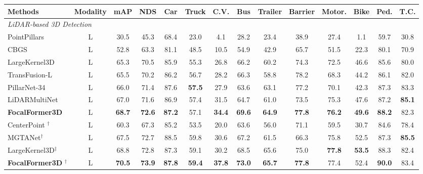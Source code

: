 \documentclass[10pt,twocolumn,letterpaper]{article}
\begin{document}
\begin{table*}[bpt]
	\begin{center}
		\begin{adjustbox}{width=1.\textwidth}
		\begin{tabular}{lccccccccccccc}
			\toprule
			Methods & Modality & mAP & NDS & Car & Truck & C.V. & Bus & Trailer & Barrier & Motor. & Bike & Ped. & T.C. \\ \midrule \midrule
                \multicolumn{5}{l}{\textit{LiDAR-based 3D Detection}} \\
                \midrule
			PointPillars \cite{pointpillar} & L & 30.5 & 45.3 & 68.4 & 23.0 & 4.1 & 28.2 & 23.4 & 38.9 & 27.4 & 1.1 & 59.7 & 30.8 \\
			CBGS \cite{cbgs} & L & 52.8 & 63.3 & 81.1 & 48.5 & 10.5 & 54.9 & 42.9 & 65.7 & 51.5 & 22.3 & 80.1 & 70.9 \\
			LargeKernel3D \cite{largekernel3d} & L & 65.3 & 70.5 & 85.9 & 55.3 & 26.8 & 66.2 & 60.2 & 74.3 & 72.5 & 46.6 & 85.6 & 80.0 \\
			TransFusion-L \cite{transfusion} & L & 65.5 & 70.2 & 86.2 & 56.7 & 28.2 & 66.3 & 58.8 & 78.2 & 68.3 & 44.2 & 86.1 & 82.0 \\
                PillarNet-34~\cite{shi2022pillarnet} & L & 66.0 & 71.4 & 87.6 &\textbf{57.5} & 27.9 & 63.6 & 63.1 & 77.2 & 70.1 & 42.3 & 87.3 & 83.3 \\
            LiDARMultiNet~\ \cite{ye2022lidarmultinet} & L & 67.0 & 71.6 & 86.9 & 57.4 & 31.5 & 64.7 & 61.0 & 73.5 & 75.3 & 47.6 & 87.2 & \textbf{85.1} \\ 
			\textbf{FocalFormer3D} & L & \textbf{68.7} & \textbf{72.6} & \textbf{87.2} & 57.1 & \textbf{34.4} & \textbf{69.6} & \textbf{64.9} & 
            \textbf{77.8} & \textbf{76.2} & \textbf{49.6} & \textbf{88.2} & 82.3
                 \\ \midrule
			CenterPoint \cite{centerpoint} $^\dag$ & L & 60.3 & 67.3 & 85.2 & 53.5 & 20.0 & 63.6 & 56.0 & 71.1 & 59.5 & 30.7 & 84.6 & 78.4 \\
                MGTANet$^\dag$~\cite{mgtanet} & L & 67.5 & 72.7 & 88.5 & 59.8 & 30.6 & 67.2 & 61.5 & 66.3 & 75.8 & 52.5 & 87.3 & \textbf{85.5} \\                 LargeKernel3D$^\ddag$~\cite{largekernel3d} & L & 68.8 & 72.8 & 87.3 & 59.1 & 30.2 & 68.5 & 65.6 & 75.0 & \textbf{77.8} & \textbf{53.5} & 88.3 & 82.4 \\
                \textbf{FocalFormer3D} $^\dag$ & L & \textbf{70.5} & \textbf{73.9} & \textbf{87.8} & \textbf{59.4} & \textbf{37.8} & \textbf{73.0} & \textbf{65.7} & \textbf{77.8} & 77.4 & 52.4 & \textbf{90.0} & 83.4 \\ 

\end{tabular}
\end{adjustbox}
\end{center}
\end{table*}
\end{document}
